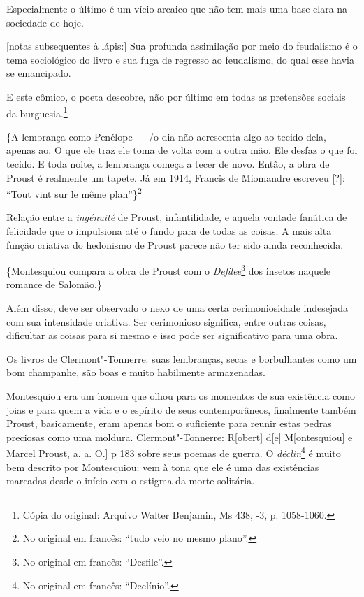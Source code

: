 Especialmente o último é um vício arcaico que não tem mais uma base
clara na sociedade de hoje.

{[}notas subsequentes à lápis:{]} Sua profunda assimilação por meio do
feudalismo é o tema sociológico do livro e sua fuga de regresso ao
feudalismo, do qual esse havia se emancipado.

E este cômico, o poeta descobre, não por último em todas as pretensões
sociais da burguesia.\footnote{Cópia do original: Arquivo Walter Benjamin, Ms 438,
-3, p. 1058-1060.}

\{A lembrança como Penélope --- /o dia não acrescenta algo ao tecido dela,
apenas ao. O que ele traz ele toma de volta com a outra mão. Ele desfaz
o que foi tecido. E toda noite, a lembrança começa a tecer de novo.
Então, a obra de Proust é realmente um tapete. Já em 1914, Francis de
Miomandre escreveu {[}?{]}: ``Tout vint sur le même plan''\}\footnote{No original em francês: ``tudo veio no mesmo plano''. \versal{[N. T.]}}

Relação entre a \emph{ingénuité} de Proust, infantilidade, e aquela
vontade fanática de felicidade que o impulsiona até o fundo para de
todas as coisas. A mais alta função criativa do hedonismo de Proust
parece não ter sido ainda reconhecida.

\{Montesquiou compara a obra de Proust com o \emph{Defilee}\footnote{No original em francês: ``Desfile''. \versal{[N. T.]}} dos insetos naquele romance de
Salomão.\}

Além disso, deve ser observado o nexo de uma certa cerimoniosidade
indesejada com sua intensidade criativa. Ser cerimonioso significa,
entre outras coisas, dificultar as coisas para si mesmo e isso pode ser
significativo para uma obra.

Os livros de Clermont"-Tonnerre: suas lembranças, secas e borbulhantes
como um bom champanhe, são boas e muito habilmente armazenadas.

Montesquiou era um homem que olhou para os momentos de sua existência
como joias e para quem a vida e o espírito de seus contemporâneos,
finalmente também Proust, basicamente, eram apenas bom o suficiente para
reunir estas pedras preciosas como uma moldura. Clermont"-Tonnerre: R{[}obert{]} d{[}e{]} M{[}ontesquiou{]} e Marcel Proust, a. a. O.{]} p
183 sobre seus poemas de guerra. O \emph{déclin}\footnote{No
  original em francês: ``Declínio''. \versal{[N. T.]}} é muito bem descrito por
Montesquiou: vem à tona que ele é uma das existências marcadas desde o
início com o estigma da morte solitária.

